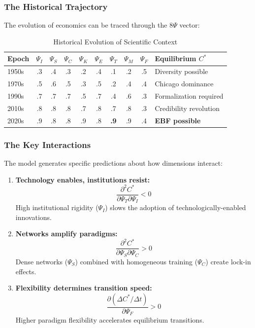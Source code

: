 \subsubsection{The Historical Trajectory}

The evolution of economics can be traced through the 8$\Psi$ vector:

\begin{table}[htbp]
\centering
\caption{Historical Evolution of Scientific Context}
\label{tab:psi-trajectory}
\renewcommand{\arraystretch}{1.2}
\small
\begin{tabular}{@{}lccccccccl@{}}
\toprule
\textbf{Epoch} & $\Psi_I$ & $\Psi_S$ & $\Psi_C$ & $\Psi_K$ & $\Psi_E$ & $\Psi_T$ & $\Psi_M$ & $\Psi_F$ & \textbf{Equilibrium $C^*$} \\
\midrule
1950s & .3 & .4 & .3 & .2 & .4 & .1 & .2 & .5 & Diversity possible \\
1970s & .5 & .6 & .5 & .3 & .5 & .2 & .4 & .4 & Chicago dominance \\
1990s & .7 & .7 & .7 & .5 & .7 & .4 & .6 & .3 & Formalization required \\
2010s & .8 & .8 & .8 & .7 & .8 & .7 & .8 & .3 & Credibility revolution \\
2020s & .9 & .8 & .8 & .9 & .8 & \textbf{.9} & .9 & .4 & \textbf{EBF possible} \\
\bottomrule
\end{tabular}
\end{table}

\subsubsection{The Key Interactions}

The model generates specific predictions about how dimensions interact:

\begin{enumerate}[nosep]
    \item \textbf{Technology enables, institutions resist:}
        \begin{equation}
        \frac{\partial^2 C^*}{\partial \Psi_T \partial \Psi_I} < 0
        \end{equation}
        High institutional rigidity ($\Psi_I$) slows the adoption of
        technologically-enabled innovations.

    \item \textbf{Networks amplify paradigms:}
        \begin{equation}
        \frac{\partial^2 C^*}{\partial \Psi_S \partial \Psi_C} > 0
        \end{equation}
        Dense networks ($\Psi_S$) combined with homogeneous training ($\Psi_C$)
        create lock-in effects.

    \item \textbf{Flexibility determines transition speed:}
        \begin{equation}
        \frac{\partial (\Delta C^* / \Delta t)}{\partial \Psi_F} > 0
        \end{equation}
        Higher paradigm flexibility accelerates equilibrium transitions.
\end{enumerate}

